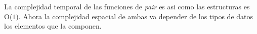 La complejidad temporal de las funciones de \emph{pair} es asi como las estructuras es O($1$). Ahora la complejidad espacial de ambas va depender de los tipos de datos los elementos que la componen. 